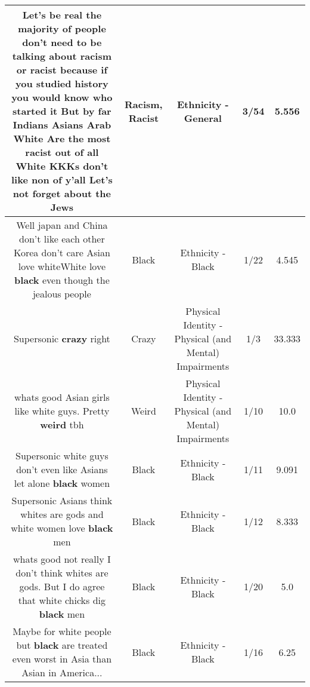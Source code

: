 \documentclass[11pt]{article}
\newlength\mylength
\begin{document}
\begin{center}
\begin{longtable}{|C{.65\mylength}|C{.30\mylength}|C{.12\mylength}|C{.12\mylength}|C{.12\mylength}|}
  \small Let's be real the majority of people don't need to be talking about \textbf{racism} or \textbf{racist} because if you studied history you would know who started it But by far Indians Asians Arab White Are the most \textbf{racist} out of all White KKKs don't like non of y'all Let's not forget about the Jews\normalsize   & Racism, Racist & Ethnicity - General & 3/54 & 5.556 \\  \hline
  \small Well japan and China don't like each other Korea don't care Asian love whiteWhite love \textbf{black} even though the jealous people\normalsize   & Black & Ethnicity - Black & 1/22 & 4.545 \\  \hline
  \small Supersonic \textbf{crazy} right\normalsize   & Crazy & Physical Identity - Physical (and Mental) Impairments & 1/3 & 33.333 \\  \hline
  \small whats good Asian girls like white guys. Pretty \textbf{weird} tbh\normalsize   & Weird & Physical Identity - Physical (and Mental) Impairments & 1/10 & 10.0 \\  \hline
  \small Supersonic white guys don't even like Asians let alone \textbf{black} women\normalsize   & Black & Ethnicity - Black & 1/11 & 9.091 \\  \hline
  \small Supersonic Asians think whites are gods and white women love \textbf{black} men\normalsize   & Black & Ethnicity - Black & 1/12 & 8.333 \\  \hline
  \small whats good not really I don't think whites are gods. But I do agree that white chicks dig \textbf{black} men\normalsize   & Black & Ethnicity - Black & 1/20 & 5.0 \\  \hline
  \small Maybe for white people but \textbf{black} are treated even worst in Asia than Asian in America...\normalsize   & Black & Ethnicity - Black & 1/16 & 6.25 \\  \hline

\end{longtable}
\end{center}
\end{document}

